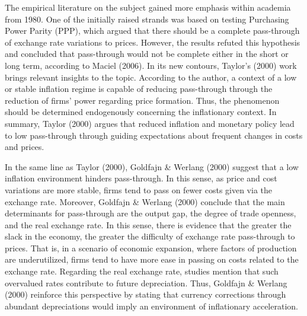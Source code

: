 \documentclass[12pt]{article}
\begin{document}
The empirical literature on the subject gained more emphasis within
academia from 1980. One of the initially raised strands was based on
testing Purchasing Power Parity (PPP), which argued that there should be
a complete pass-through of exchange rate variations to prices. However,
the results refuted this hypothesis and concluded that pass-through
would not be complete either in the short or long term, according to
Maciel (2006). In its new contours, Taylor's (2000) work brings relevant
insights to the topic. According to the author, a context of a low or
stable inflation regime is capable of reducing pass-through through the
reduction of firms' power regarding price formation. Thus, the
phenomenon should be determined endogenously concerning the inflationary
context. In summary, Taylor (2000) argues that reduced inflation and
monetary policy lead to low pass-through through guiding expectations
about frequent changes in costs and prices.

In the same line as Taylor (2000), Goldfajn \& Werlang (2000) suggest
that a low inflation environment hinders pass-through. In this sense, as
price and cost variations are more stable, firms tend to pass on fewer
costs given via the exchange rate. Moreover, Goldfajn \& Werlang (2000)
conclude that the main determinants for pass-through are the output gap,
the degree of trade openness, and the real exchange rate. In this sense,
there is evidence that the greater the slack in the economy, the greater
the difficulty of exchange rate pass-through to prices. That is, in a
scenario of economic expansion, where factors of production are
underutilized, firms tend to have more ease in passing on costs related
to the exchange rate. Regarding the real exchange rate, studies mention
that such overvalued rates contribute to future depreciation. Thus,
Goldfajn \& Werlang (2000) reinforce this perspective by stating that
currency corrections through abundant depreciations would imply an
environment of inflationary acceleration.
\end{document}
